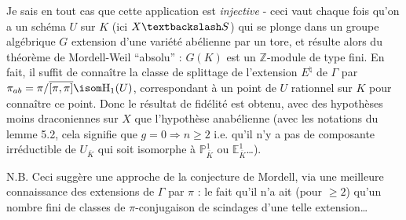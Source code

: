 \begin{enumerate}
    Je sais en tout cas que cette application est \emph{injective} - ceci vaut chaque fois qu'on a un schéma $U$ sur $K$ (ici $X \textbackslash S$) qui se plonge dans un groupe algébrique $G$ extension d'une variété abélienne par un tore, et résulte alors du théorème de Mordell-Weil ``absolu'' : $G(K)$ est un $\mathbb{Z}$-module de type fini. En fait, il suffit de connaître la classe de splittage de l'extension $E^\natural$ de $\Gamma$ par $\pi_{ab} = \pi/\overline{[\pi, \pi]} \isom \mathrm{H}_1(U)$, correspondant à un point de $U$ rationnel sur $K$ pour connaître ce point. Donc le résultat de fidélité est obtenu, avec des hypothèses moins draconiennes sur $X$ que l'hypothèse anabélienne (avec les notations du lemme 5.2, cela signifie que $g = 0 \Rightarrow n \geq 2$ i.e. qu'il n'y a pas de composante irréductible de $U_{\overline{K}}$ qui soit isomorphe à $\mathbb{P}^1_{\overline{K}}$ ou $\mathbb{E}^1_{\overline{K}}$\dots).
    
    N.B. Ceci suggère une approche de la conjecture de Mordell, via une meilleure connaissance des extensions de $\Gamma$ par $\pi$ : le fait qu'il n'a ait (pour $\geq 2$) qu'un nombre fini de classes de $\pi$-conjugaison de scindages d'une telle extension\dots
    

\end{enumerate}

